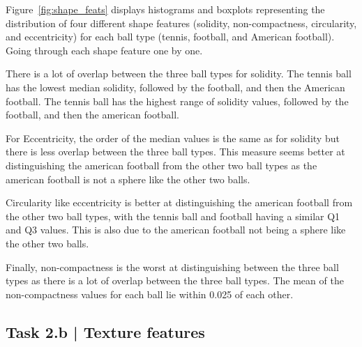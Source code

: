 \documentclass[conference]{IEEEtran}
\begin{document}
Figure~\ref{fig:shape_feats} displays histograms and boxplots representing the distribution of four different shape features (solidity, non-compactness, circularity, and eccentricity) for each ball type (tennis, football, and American football).\\
Going through each shape feature one by one. 

There is a lot of overlap between the three ball types for solidity. 
The tennis ball has the lowest median solidity, followed by the football, and then the American football. 
The tennis ball has the highest range of solidity values, followed by the football, and then the american football. 

For Eccentricity, the order of the median values is the same as for solidity but there is less overlap between the three ball types.
This measure seems better at distinguishing the american football from the other two ball types as the american football is not a sphere like the other two balls.

Circularity like eccentricity is better at distinguishing the american football from the other two ball types, with the tennis ball and football having a similar Q1 and Q3 values.
This is also due to the american football not being a sphere like the other two balls.

Finally, non-compactness is the worst at distinguishing between the three ball types as there is a lot of overlap between the three ball types.
The mean of the non-compactness values for each ball lie within 0.025 of each other.

\subsection*{Task 2.b | Texture features}
\end{document}
